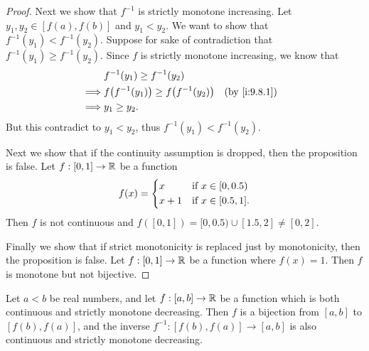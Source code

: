 \begin{proof}
  Next we show that \(f^{-1}\) is strictly monotone increasing.
  Let \(y_1, y_2 \in [f(a), f(b)]\) and \(y_1 < y_2\).
  We want to show that \(f^{-1}(y_1) < f^{-1}(y_2)\).
  Suppose for sake of contradiction that \(f^{-1}(y_1) \geq f^{-1}(y_2)\).
  Since \(f\) is strictly monotone increasing, we know that
  \begin{align*}
             & f^{-1}(y_1) \geq f^{-1}(y_2)                                         \\
    \implies & f\big(f^{-1}(y_1)\big) \geq f\big(f^{-1}(y_2)\big) &  & \by{i:9.8.1} \\
    \implies & y_1 \geq y_2.
  \end{align*}
  But this contradict to \(y_1 < y_2\), thus \(f^{-1}(y_1) < f^{-1}(y_2)\).

  Next we show that if the continuity assumption is dropped, then the proposition is false.
  Let \(f : [0, 1] \to \mathbb{R}\) be a function
  \[
    f(x) = \begin{dcases}
      x     & \text{if } x \in [0, 0.5)  \\
      x + 1 & \text{if } x \in [0.5, 1].
    \end{dcases}
  \]
  Then \(f\) is not continuous and \(f([0, 1]) = [0, 0.5) \cup [1.5, 2] \neq [0, 2]\).

  Finally we show that if strict monotonicity is replaced just by monotonicity, then the proposition is false.
  Let \(f : [0, 1] \to \mathbb{R}\) be a function where \(f(x) = 1\).
  Then \(f\) is monotone but not bijective.
\end{proof}

\begin{ac}\label{i:ac:9.8.1}
  Let \(a < b\) be real numbers, and let \(f : [a, b] \to \mathbb{R}\) be a function which is both continuous and strictly monotone decreasing.
  Then \(f\) is a bijection from \([a, b]\) to \([f(b), f(a)]\), and the inverse \(f^{-1} : [f(b), f(a)] \to [a, b]\) is also continuous and strictly monotone decreasing.
\end{ac}


